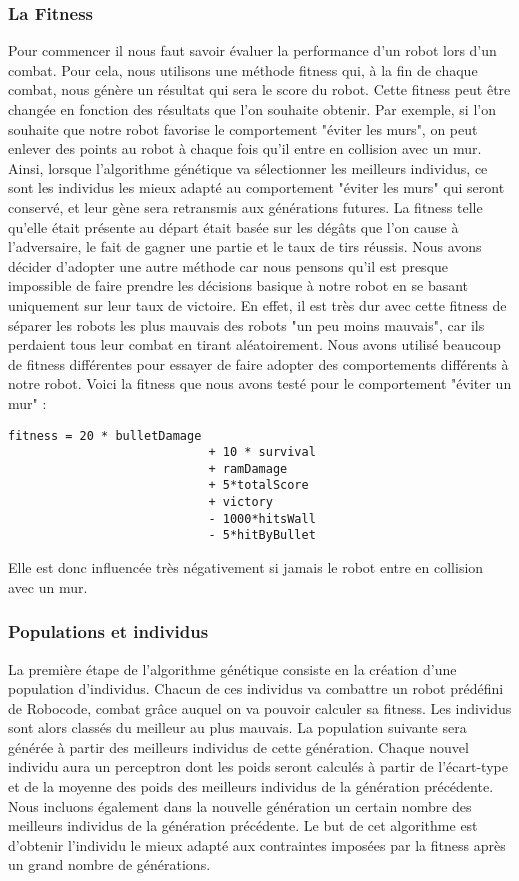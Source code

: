 \documentclass[12pt]{article}
\begin{document}
\subsubsection{La Fitness}
Pour commencer il nous faut savoir évaluer la performance d'un robot lors d'un combat. Pour cela, nous utilisons une méthode fitness qui, à la fin de chaque combat, nous génère un résultat qui sera le score du robot. Cette fitness peut être changée en fonction des résultats que l'on souhaite obtenir. Par exemple, si l'on souhaite que notre robot favorise le comportement "éviter les murs", on peut enlever des points au robot à chaque fois qu'il entre en collision avec un mur. Ainsi, lorsque l'algorithme génétique va sélectionner les meilleurs individus, ce sont les individus les mieux adapté au comportement "éviter les murs" qui seront conservé, et leur gène sera retransmis aux générations futures. La fitness telle qu'elle était présente au départ était basée sur les dégâts que l'on cause à l'adversaire, le fait de gagner une partie et le taux de tirs réussis. Nous avons décider d'adopter une autre méthode car nous pensons qu'il est presque impossible de faire prendre les décisions basique à notre robot en se basant uniquement sur leur taux de victoire. En effet, il est très dur avec cette fitness de séparer les robots les plus mauvais des robots "un peu moins mauvais", car ils perdaient tous leur combat en tirant aléatoirement.
Nous avons utilisé beaucoup de fitness différentes pour essayer de faire adopter des comportements différents à notre robot. Voici la fitness que nous avons testé pour le comportement "éviter un mur" : 

\begin{lstlisting}
fitness = 20 * bulletDamage
                            + 10 * survival
                            + ramDamage
                            + 5*totalScore
                            + victory
                            - 1000*hitsWall
                            - 5*hitByBullet
 \end{lstlisting}
 Elle est donc influencée très négativement si jamais le robot entre en collision avec un mur.

\subsubsection{Populations et individus}
La première étape de l'algorithme génétique consiste en la création d'une population d'individus. Chacun de ces individus va combattre un robot prédéfini de Robocode, combat grâce auquel on va pouvoir calculer sa fitness. Les individus sont alors classés du meilleur au plus mauvais. La population suivante sera générée à partir des meilleurs individus de cette génération. Chaque nouvel individu aura un perceptron dont les poids seront calculés à partir de l'écart-type et de la moyenne des poids des meilleurs individus de la génération précédente. Nous incluons également dans la nouvelle génération un certain nombre des meilleurs individus de la génération précédente. Le but de cet algorithme est d'obtenir l'individu le mieux adapté aux contraintes imposées par la fitness après un grand nombre de générations.
\end{document}
